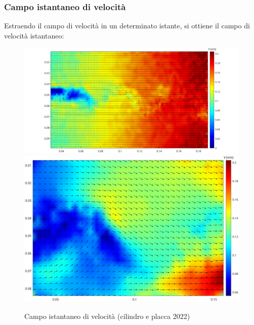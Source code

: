 \subsubsection{Campo istantaneo di velocità}
Estraendo il campo di velocità in un determinato istante, si ottiene il campo di velocità istantaneo:
\begin{figure}[H]
    \centering
    \includegraphics[height=.45\textwidth]{images/11/f300_22b.png}
    \includegraphics[height=.45\textwidth]{images/11/f300_220.png}
    \caption{Campo istantaneo di velocità (cilindro e placca 2022)}
\end{figure}

